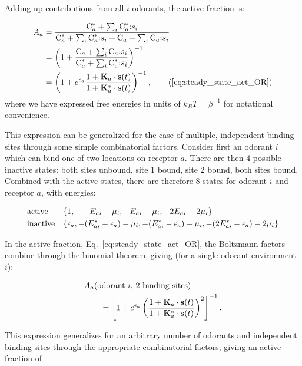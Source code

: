 \documentclass[9pt,lineno]{elife}
\begin{document}
Adding up contributions from all $i$ odorants, the active fraction is:

\begin{align}
A_a &= \frac{
	\textup{C}^*_a + \sum_i \textup{C}^*_a\textup{:}s_i}{\textup{C}^*_a + \sum_i \textup{C}^*_a\textup{:}s_i + \textup{C}_a + \sum_i \textup{C}_a\textup{:}s_i} \nonumber \\
&= \left(1 + \frac{\textup{C}_a + \sum_i \textup{C}_a\textup{:}s_i}
{\textup{C}^*_a + \sum_i \textup{C}^*_a\textup{:}s_i} \right)^{-1} 
\nonumber \\
&= \left(1 + e^{\epsilon_a}\frac{1 + \mathbf{K}_a\cdot\mathbf{s}(t)}{1 + \mathbf{K}^*_a\cdot\mathbf{s}(t)}
\right)^{-1}, 
\tag{\ref{eq:steady_state_act_OR}}
\end{align} 
where we have expressed free energies in units of $k_B T=\beta^{-1}$ for notational convenience.

This expression can be generalized for the case of multiple, independent binding sites through some simple combinatorial factors. Consider first an odorant $i$ which can bind one of two locations on receptor $a$. There are then 4 possible inactive states: both sites unbound, site 1 bound, site 2 bound, both sites bound. Combined with the active states, there are therefore 8 states for odorant $i$ and receptor $a$, with energies: 

\begin{align}
& \textup{active}  
&& \{1, \quad -E_{ai} - \mu_i, -E_{ai} - \mu_i, -2E_{ai} - 2\mu_i\} \nonumber \\
& \textup{inactive}  
&& \{\epsilon_a, -(E^*_{ai}  - \epsilon_a) - \mu_i, 
-(E^*_{ai}  - \epsilon_a) - \mu_i, -(2E^*_{ai}  - \epsilon_a) - 2\mu_i\} 
\end{align}

In the active fraction, Eq.~\ref{eq:steady_state_act_OR}, the Boltzmann factors combine through the binomial theorem, giving (for a single odorant environment $i$):

\begin{align}
&A_a(\textup {odorant }i \textup{, 2 binding sites})  \nonumber \\
&\qquad =\left[1 + e^{\epsilon_a}\left(\frac{1 + \mathbf{K}_a\cdot\mathbf{s}(t)}{1 + \mathbf{K}^*_a\cdot\mathbf{s}(t)}\right)^2\right]^{-1}.
\end{align} 

This expression generalizes for an arbitrary number of odorants and independent binding sites through the appropriate combinatorial factors, giving an active fraction of
\end{document}
